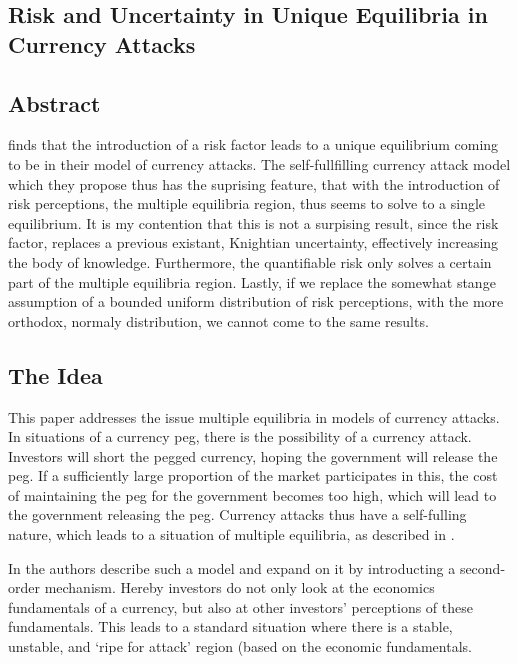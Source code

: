 \documentclass[a4paper]{report}
\begin{document}
\begin{refsection}
\chapter{Risk and Uncertainty in Unique Equilibria in Currency Attacks}
\label{unc}
\section*{Abstract}
\textcite{morris1998unique} finds that the introduction of a risk factor leads to a unique equilibrium coming to be in their model of currency attacks.
The self-fullfilling currency attack model which they propose thus has the suprising feature,
that with the introduction of risk perceptions, the multiple equilibria region, thus seems to solve to a single equilibrium.
It is my contention that this is not a surpising result, since the risk factor, replaces a previous existant, Knightian uncertainty, effectively increasing the body of knowledge.
Furthermore, the quantifiable risk only solves a certain part of the multiple equilibria region.
Lastly, if we replace the somewhat stange assumption of a bounded uniform distribution of risk perceptions,
with the more orthodox, normaly distribution, we cannot come to the same results.

\section{The Idea}
\label{unc:idea}
This paper addresses the issue multiple equilibria in models of currency attacks.
In situations of a currency peg, there is the possibility of a currency attack.
Investors will short the pegged currency, hoping the government will release the peg.
If a sufficiently large proportion of the market participates in this,
the cost of maintaining the peg for the government becomes too high,
which will lead to the government releasing the peg.
Currency attacks thus have a self-fulling nature,
which leads to a situation of multiple equilibria,
as described in \textcite{obstfeld1986rational,obstfeld1995logic,obstfeld1996models}.

In \textcite{morris1998unique} the authors describe such a model
and expand on it by introducting a second-order mechanism.
Hereby investors do not only look at the economics fundamentals of a currency,
but also at other investors' perceptions of these fundamentals.
This leads to a standard situation where there is a stable, unstable, and `ripe for attack' region (based on the economic fundamentals.


\end{refsection}
\end{document}
